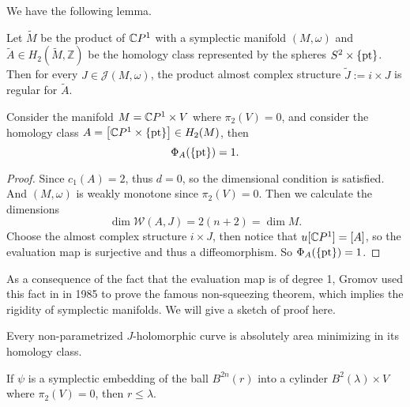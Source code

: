 \documentclass[twoside]{article}
\begin{document}
We have the following lemma.

\begin{lemma}
    Let $\widetilde{M}$ be the product of $\mathbb{C}P^{1}$ with a symplectic manifold 
    $(M,\omega)$ and $\widetilde{A}\in H_2(\widetilde{M},\mathbb{Z})$ 
    be the homology class represented by the spheres $S^2\times\{\operatorname{pt}\}  $. 
    Then for every $J\in\mathscr{J}(M,\omega)$, 
    the product almost complex structure $\widetilde{J}:=i\times J$ is regular for $\widetilde{A}$.
\end{lemma}

\begin{example}
    Consider the manifold $M=\mathbb{C}P^{1}\times V$ where $\pi_2(V)=0$, 
    and consider the homology class $A=\left[\mathbb{C}P^{1}\times \{\operatorname{pt}\}\right]\in H_2(M)$, then
    \[\Phi_{A}(\{\operatorname{pt}\})=1.\]
\end{example}

\begin{proof}
    Since $c_1(A)=2$, thus $d=0$, so the dimensional condition is satisfied.  
    And $(M,\omega)$ is weakly monotone since $\pi_2(V)=0$. 
    Then we calculate the dimensions
    \[\dim\mathscr{W}(A,J)=2(n+2)=\dim M.\]
    Choose the almost complex structure $i\times J$, then notice that $u[\mathbb{C}P^{1}]=[A]$, 
    so the evaluation map is surjective and thus a diffeomorphism. So $\Phi_{A}(\{\operatorname{pt}\})=1$.
\end{proof} 

As a consequence of the fact that the evaluation map is of degree 1, 
Gromov used this fact in \cite{gromov} in 1985 to prove the famous non-squeezing theorem, 
which implies the rigidity of symplectic manifolds. We will give a sketch of proof here. 

\begin{lemma}
    Every non-parametrized $J$-holomorphic curve is absolutely area minimizing in its homology class.
\end{lemma}

\begin{theorem}
    If $\psi$ is a symplectic embedding of the ball $B^{2n}(r)$ into a cylinder $B^2(\lambda)\times V$ where $\pi_2(V)=0$, then $r\leq \lambda$.
\end{theorem}
\end{document}
